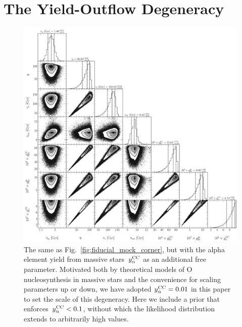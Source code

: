 

\section{The Yield-Outflow Degeneracy}
\label{sec:degeneracy}

\begin{figure}
\centering
\includegraphics[scale = 0.38]{chapter4/degeneracy_512k.pdf}
\caption{
The same as Fig.~\ref{fig:fiducial_mock_corner}, but with the alpha element
yield from massive stars~$y_\alpha^\text{CC}$ as an additional free parameter.
Motivated both by theoretical models of O nucleosynthesis in massive stars and
the convenience for scaling parameters up or down, we have adopted
$y_\alpha^\text{CC} = 0.01$ in this paper to set the scale of this degeneracy.
Here we include a prior that enforces~$y_\alpha^\text{CC} < 0.1$, without which the
likelihood distribution extends to arbitrarily high values.
}
\label{fig:degeneracy}
\end{figure}

